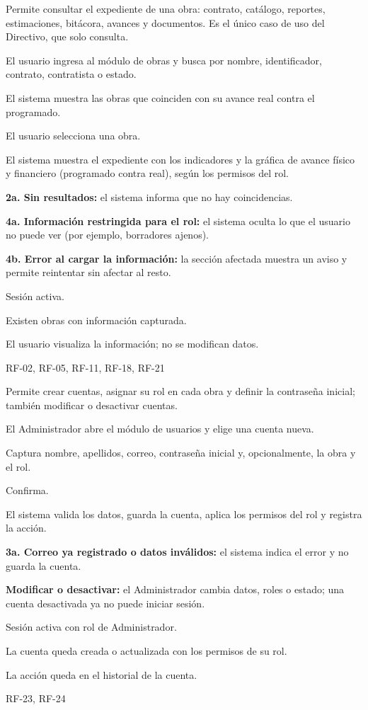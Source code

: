 {Permite consultar el expediente de una obra: contrato, catálogo, reportes, estimaciones, bitácora, avances y documentos. Es el único caso de uso del Directivo, que solo consulta.}
{\item El usuario ingresa al módulo de obras y busca por nombre, identificador, contrato, contratista o estado.
 \item El sistema muestra las obras que coinciden con su avance real contra el programado.
 \item El usuario selecciona una obra.
 \item El sistema muestra el expediente con los indicadores y la gráfica de avance físico y financiero (programado contra real), según los permisos del rol.}
{\item \textbf{2a. Sin resultados:} el sistema informa que no hay coincidencias.
 \item \textbf{4a. Información restringida para el rol:} el sistema oculta lo que el usuario no puede ver (por ejemplo, borradores ajenos).
 \item \textbf{4b. Error al cargar la información:} la sección afectada muestra un aviso y permite reintentar sin afectar al resto.}
{\item Sesión activa.
 \item Existen obras con información capturada.}
{\item El usuario visualiza la información; no se modifican datos.}
{RF-02, RF-05, RF-11, RF-18, RF-21}

{Permite crear cuentas, asignar su rol en cada obra y definir la contraseña inicial; también modificar o desactivar cuentas.}
{\item El Administrador abre el módulo de usuarios y elige una cuenta nueva.
 \item Captura nombre, apellidos, correo, contraseña inicial y, opcionalmente, la obra y el rol.
 \item Confirma.
 \item El sistema valida los datos, guarda la cuenta, aplica los permisos del rol y registra la acción.}
{\item \textbf{3a. Correo ya registrado o datos inválidos:} el sistema indica el error y no guarda la cuenta.
 \item \textbf{Modificar o desactivar:} el Administrador cambia datos, roles o estado; una cuenta desactivada ya no puede iniciar sesión.}
{\item Sesión activa con rol de Administrador.}
{\item La cuenta queda creada o actualizada con los permisos de su rol.
 \item La acción queda en el historial de la cuenta.}
{RF-23, RF-24}

